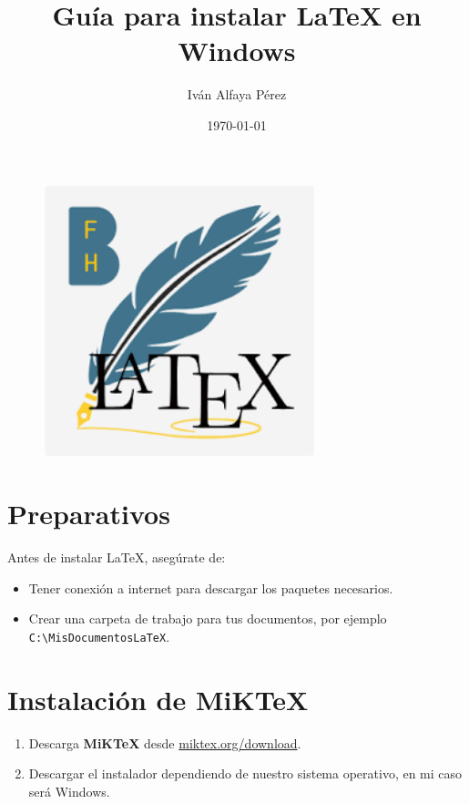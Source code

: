 \documentclass{article}
\title{Guía para instalar LaTeX en Windows}
\author{Iván Alfaya Pérez}
\date{\today}
\begin{document}
\maketitle

\begin{figure}[h!]
    \centering
    \includegraphics[width=0.7\textwidth]{latex.png}
\end{figure}
\newpage
\tableofcontents

\newpage

\section{Preparativos}
Antes de instalar LaTeX, asegúrate de:

\begin{itemize}
    \item Tener conexión a internet para descargar los paquetes necesarios.
    \item Crear una carpeta de trabajo para tus documentos, por ejemplo \texttt{C:\textbackslash MisDocumentosLaTeX}.
\end{itemize}

\section{Instalación de MiKTeX}
\begin{enumerate}
    \item Descarga \textbf{MiKTeX} desde \href{https://miktex.org/download}{miktex.org/download}.
    
    \item Descargar el instalador dependiendo de nuestro sistema operativo, en mi caso será Windows.
\end{enumerate}
\end{document}
